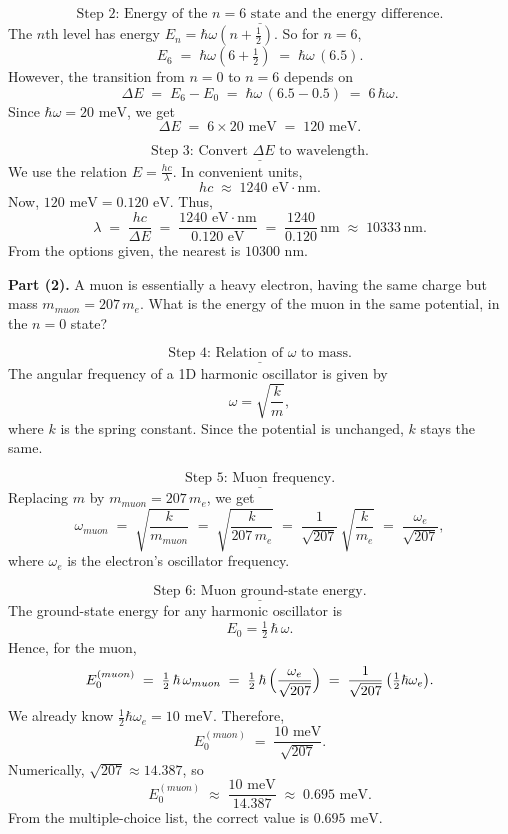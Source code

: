 \documentclass[12pt]{article}
\theoremstyle{definition} %
\theoremstyle{plain} %
\begin{document}
\[
\underline{\text{Step 2: Energy of the }n=6\text{ state and the energy difference.}}
\]
The $n$th level has energy $E_{n} = \hbar \omega \left(n + \tfrac12\right)$.  
So for $n=6$,
\[
E_6 \;=\; \hbar \omega \left(6 + \tfrac12\right)
        \;=\; \hbar \omega \,(6.5).
\]
However, the transition from $n=0$ to $n=6$ depends on 
\[
\Delta E \;=\; E_6 - E_0 
           \;=\; \hbar\omega \,(6.5 - 0.5) 
           \;=\; 6\,\hbar \omega.
\]
Since $\hbar \omega = 20\text{ meV}$, we get
\[
\Delta E \;=\; 6 \times 20\text{ meV} 
            \;=\; 120\text{ meV}.
\]

\[
\underline{\text{Step 3: Convert } \Delta E \text{ to wavelength.}}
\]
We use the relation $E = \frac{hc}{\lambda}$.  In convenient units, 
\[
hc \;\approx\; 1240 \text{ eV}\cdot \text{nm}.
\]
Now, $120\text{ meV} = 0.120\text{ eV}$. Thus,
\[
\lambda 
   \;=\; \frac{hc}{\Delta E} 
   \;=\; \frac{1240\text{ eV}\cdot\text{nm}}{0.120\text{ eV}} 
   \;=\; \frac{1240}{0.120}\,\text{nm}
   \;\approx\; 10333\,\text{nm}.
\]
From the options given, the nearest is $\boxed{10300\text{ nm}.}$

\vspace{1em}
\noindent\textbf{Part (2).} 
A muon is essentially a heavy electron, having the same charge but mass $m_{muon} = 207\, m_e$. 
What is the energy of the muon in the same potential, in the $n=0$ state?

\[
\underline{\text{Step 4: Relation of }\omega\text{ to mass.}}
\]
The angular frequency of a 1D harmonic oscillator is given by 
\[
\omega = \sqrt{\frac{k}{m}},
\]
where $k$ is the spring constant.  Since the potential is unchanged, $k$ stays the same.

\[
\underline{\text{Step 5: Muon frequency.}}
\]
Replacing $m$ by $m_{muon} = 207\,m_e$, we get
\[
\omega_{muon} 
   \;=\; \sqrt{\frac{k}{m_{muon}}} 
   \;=\; \sqrt{\frac{k}{207\,m_e}}
   \;=\; \frac{1}{\sqrt{207}} \,\sqrt{\frac{k}{m_e}}
   \;=\; \frac{\omega_e}{\sqrt{207}},
\]
where $\omega_e$ is the electron's oscillator frequency.

\[
\underline{\text{Step 6: Muon ground-state energy.}}
\]
The ground-state energy for any harmonic oscillator is
\[
E_0 = \tfrac12 \,\hbar \,\omega.
\]
Hence, for the muon,
\[
E_{0}^{(muon)} 
   \;=\; \tfrac12 \,\hbar \,\omega_{muon} 
   \;=\; \tfrac12 \,\hbar \,\Bigl(\frac{\omega_e}{\sqrt{207}}\Bigr) 
   \;=\; \frac{1}{\sqrt{207}} \,\bigl(\tfrac12 \hbar \omega_e \bigr).
\]
We already know $\tfrac12 \hbar \omega_e = 10\text{ meV}$. Therefore,
\[
E_{0}^{(muon)} 
   \;=\; \frac{10\text{ meV}}{\sqrt{207}}.
\]
Numerically, $\sqrt{207} \approx 14.387$, so
\[
E_{0}^{(muon)} 
   \;\approx\; \frac{10\text{ meV}}{14.387}
   \;\approx\; 0.695\text{ meV}.
\]
From the multiple-choice list, the correct value is $\boxed{0.695\text{ meV}.}$
\end{document}
